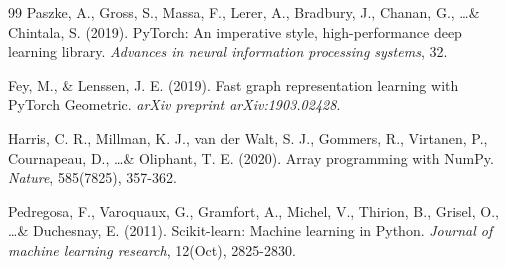\documentclass[12pt]{article}
\begin{document}
\begin{thebibliography}{99}
Paszke, A., Gross, S., Massa, F., Lerer, A., Bradbury, J., Chanan, G., \ldots \& Chintala, S. (2019). PyTorch: An imperative style, high-performance deep learning library. \textit{Advances in neural information processing systems}, 32.

Fey, M., \& Lenssen, J. E. (2019). Fast graph representation learning with PyTorch Geometric. \textit{arXiv preprint arXiv:1903.02428}.

Harris, C. R., Millman, K. J., van der Walt, S. J., Gommers, R., Virtanen, P., Cournapeau, D., \ldots \& Oliphant, T. E. (2020). Array programming with NumPy. \textit{Nature}, 585(7825), 357-362.

Pedregosa, F., Varoquaux, G., Gramfort, A., Michel, V., Thirion, B., Grisel, O., \ldots \& Duchesnay, E. (2011). Scikit-learn: Machine learning in Python. \textit{Journal of machine learning research}, 12(Oct), 2825-2830.

\end{thebibliography}
\end{document}

